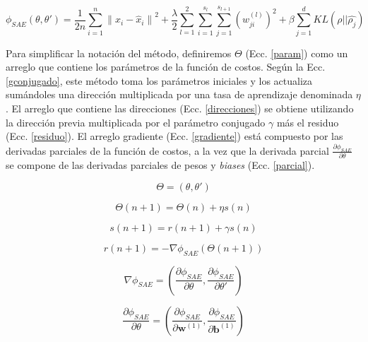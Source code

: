\documentclass[a4paper,12pt]{article}
\begin{document}
\begin{equation}
\label{scost}
\phi_{SAE}(\theta,\theta')=\frac{1}{2n}\sum_{i=1}^{n}{\|x_{i}-\hat{x}_{i}\|}^2 + \frac{\lambda}{2}\sum_{l=1}^{2}\sum_{i=1}^{s_l}\sum_{j=1}^{s_{l+1}}({w^{(l)}_{ji}})^2 + \beta\sum_{j=1}^{d}KL(\rho||\hat{\rho_{j}})
\end{equation} 

Para simplificar la notación del método, definiremos $\Theta$ (Ecc. \ref{param}) como un arreglo que contiene los parámetros de la función de costos. Según la Ecc. \ref{gconjugado}, este método toma los parámetros iniciales y los actualiza sumándoles una dirección multiplicada por una tasa de aprendizaje denominada $\eta$. El arreglo que contiene las direcciones (Ecc. \ref{direcciones}) se obtiene utilizando la dirección previa multiplicada por el parámetro conjugado $\gamma$ más el residuo (Ecc. \ref{residuo}). El arreglo gradiente (Ecc. \ref{gradiente}) está compuesto por las derivadas parciales de la función de costos, a la vez que la derivada parcial $\frac{\partial{\phi_{SAE}}}{\partial{\theta}}$ se compone de las derivadas parciales de pesos y \textit{biases} (Ecc. \ref{parcial}).

\begin{equation}
\label{param}
\Theta = (\theta,\theta')
\end{equation} 

\begin{equation}
\label{gconjugado}
\Theta(n+1)=\Theta(n)+{\eta}s(n)
\end{equation}

\begin{equation}
\label{direcciones}
s(n+1)=r(n+1)+\gamma{s(n)}
\end{equation} 

\begin{equation}
\label{residuo}
r(n+1) = -\nabla{\phi_{SAE}(\Theta(n+1))}
\end{equation} 

\begin{equation}
\label{gradiente}
\nabla{\phi_{SAE}} = \left(\frac{\partial{\phi_{SAE}}}{\partial{\theta}},\frac{\partial{\phi_{SAE}}}{\partial{\theta'}}\right)
\end{equation}

\begin{equation}
\label{parcial}
\frac{\partial{\phi_{SAE}}}{\partial{\theta}} = \left(\frac{\partial{\phi_{SAE}}}{\partial{\textbf{w}^{(1)}}},\frac{\partial{\phi_{SAE}}}{\partial{\textbf{b}^{(1)}}}\right)
\end{equation}  
\end{document}
